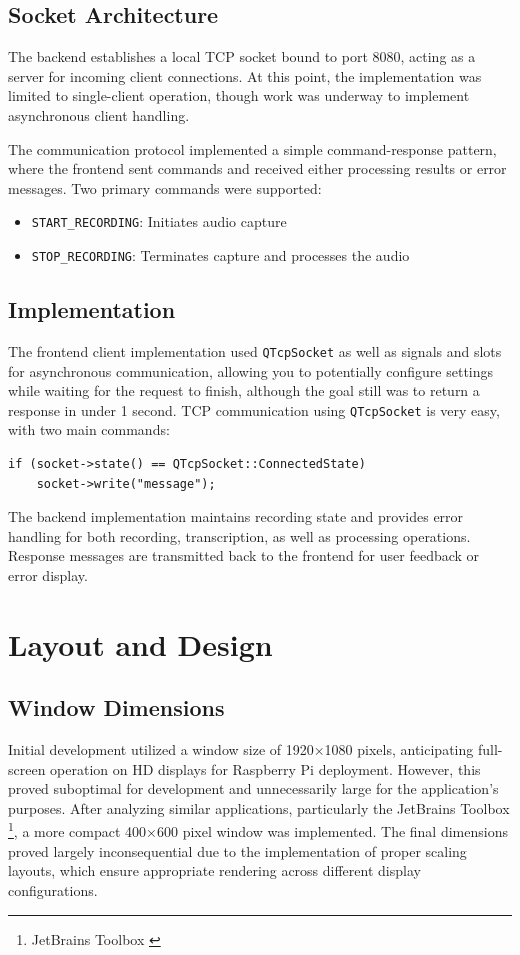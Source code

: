 \subsection{Socket Architecture}
The backend establishes a local TCP socket bound to port 8080,
acting as a server for incoming client connections.
At this point, the implementation was limited to single-client operation,
though work was underway to implement asynchronous client handling.

The communication protocol implemented a simple command-response pattern,
where the frontend sent commands and received either processing results or error messages.
Two primary commands were supported:

\begin{itemize}
    \item \texttt{START\_RECORDING}: Initiates audio capture
    \item \texttt{STOP\_RECORDING}: Terminates capture and processes the audio
\end{itemize}

\subsection{Implementation}
The frontend client implementation used \texttt{QTcpSocket} as well as signals and slots for asynchronous communication,
allowing you to potentially configure settings while waiting for the request to finish, although the goal
still was to return a response in under 1 second.
TCP communication using \texttt{QTcpSocket} is very easy, with two main commands:

\begin{verbatim}
if (socket->state() == QTcpSocket::ConnectedState)
    socket->write("message");
\end{verbatim}

The backend implementation maintains recording state and provides error handling for
both recording, transcription, as well as processing operations. Response messages are transmitted
back to the frontend for user feedback or error display.

\section{Layout and Design}
\subsection{Window Dimensions}
Initial development utilized a window size of 1920×1080 pixels,
anticipating full-screen operation on HD displays for Raspberry Pi deployment.
However, this proved suboptimal for development and unnecessarily large for the application's purposes.
After analyzing similar applications, particularly the JetBrains Toolbox \footnote{JetBrains Toolbox \cite{jetbrains-toolbox}},
a more compact 400×600 pixel window was implemented.
The final dimensions proved largely inconsequential due to the implementation
of proper scaling layouts, which ensure appropriate rendering across different display configurations.

